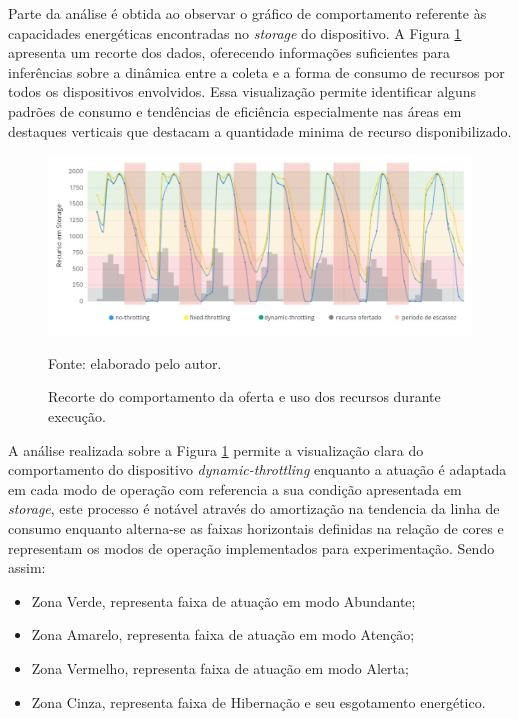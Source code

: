 Parte da análise é obtida ao observar o gráfico de comportamento referente às capacidades energéticas encontradas no \textit{storage} do dispositivo. A Figura \ref{fig:cap6recortecomportamentostorage} apresenta um recorte dos dados, oferecendo informações suficientes para inferências sobre a dinâmica entre a coleta e a forma de consumo de recursos por todos os dispositivos envolvidos. Essa visualização permite identificar alguns padrões de consumo e tendências de eficiência especialmente nas áreas em destaques verticais que destacam a quantidade minima de recurso disponibilizado.

\begin{figure}[H]
	\centering	
	\caption{Recorte do comportamento da oferta e uso dos recursos durante execução.} 
	\label{fig:cap6recortecomportamentostorage}
	\noindent\includegraphics[width=1\linewidth]{Imagens/cap6/cap6recortecomportamentostorage.jpg} 
	
	Fonte: elaborado pelo autor.
\end{figure}

A análise realizada sobre a Figura \ref{fig:cap6recortecomportamentostorage} permite a visualização clara do comportamento do dispositivo \textit{dynamic-throttling} enquanto a atuação é adaptada em cada modo de operação com referencia a sua condição apresentada em \textit{storage}, este processo é notável através do amortização na tendencia da linha de consumo enquanto alterna-se as faixas horizontais definidas na relação de cores e representam os modos de operação implementados para experimentação. Sendo assim:

\begin{itemize}
	\item Zona Verde, representa faixa de atuação em modo Abundante;
	\item Zona Amarelo, representa faixa de atuação em modo Atenção;
	\item Zona Vermelho, representa faixa de atuação em modo Alerta;
	\item Zona Cinza, representa faixa de Hibernação e seu esgotamento energético.
\end{itemize} 

